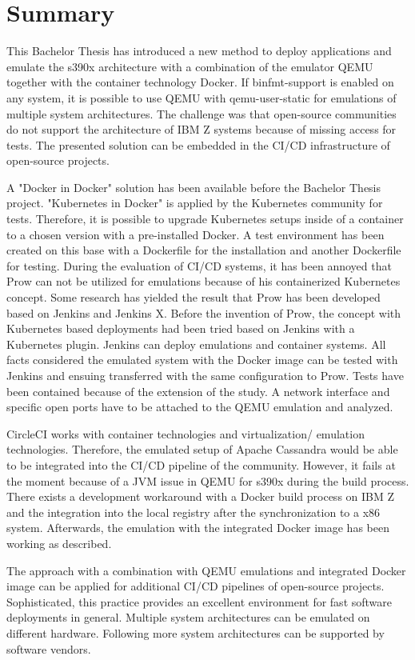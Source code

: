 \chapter{Summary}\label{ch:summary}

This Bachelor Thesis has introduced a new method to deploy applications and emulate the s390x architecture with a combination of the emulator QEMU together with the container technology Docker.
If binfmt-support is enabled on any system, it is possible to use QEMU with qemu-user-static for emulations of multiple system architectures. 
The challenge was that open-source communities do not support the architecture of IBM Z systems because of missing access for tests. The presented solution can be embedded in the CI/CD infrastructure of open-source projects. 

A "Docker in Docker" solution has been available before the Bachelor Thesis project. "Kubernetes in Docker" is applied by the Kubernetes community for tests. 
Therefore, it is possible to upgrade Kubernetes setups inside of a container to a chosen version with a pre-installed Docker. A test environment has been created on this base with a Dockerfile for the installation and another Dockerfile for testing. During the evaluation of CI/CD systems, it has been annoyed that Prow can not be utilized for emulations because of his containerized Kubernetes concept. 
Some research has yielded the result that Prow has been developed based on Jenkins and Jenkins X. Before the invention of Prow, the concept with Kubernetes based deployments had been  tried based on Jenkins with a Kubernetes plugin. Jenkins can deploy emulations and container systems. 
All facts considered the emulated system with the Docker image can be tested with Jenkins and ensuing transferred with the same configuration to Prow.
Tests have been contained because of the extension of the study. A network interface and specific open ports have to be attached to the QEMU emulation and analyzed. 

CircleCI works with container technologies and virtualization/ emulation technologies. 
Therefore, the emulated setup of Apache Cassandra would be able to be integrated into the CI/CD pipeline of the community. However, it fails at the moment because of a JVM issue in QEMU for s390x during the build process. 
There exists a development workaround with a Docker build process on IBM Z and the integration into the local registry after the synchronization to a x86 system. Afterwards, the emulation with the integrated Docker image has been working as described.

The approach with a combination with QEMU emulations and integrated Docker image can be applied for additional CI/CD pipelines of open-source projects. Sophisticated, this practice provides an excellent environment for fast software deployments in general. 
Multiple system architectures can be emulated on different hardware. Following more system architectures can be supported by software vendors.